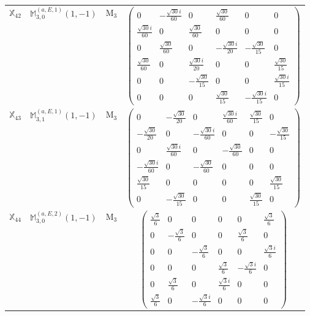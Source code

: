 \documentclass[fleqn,10pt,landscape]{article}
\begin{document}
\begin{itemize}
\begin{center}
\begin{longtable}{c|c|c|c}
$ \mathbb{X}_{42} $ & $\mathbb{M}_{3,0}^{(a,E,1)}(1,-1)$ & M$_{3}$ & $\begin{pmatrix} 0 & - \frac{\sqrt{30} i}{60} & 0 & \frac{\sqrt{30}}{60} & 0 & 0 \\ \frac{\sqrt{30} i}{60} & 0 & \frac{\sqrt{30}}{60} & 0 & 0 & 0 \\ 0 & \frac{\sqrt{30}}{60} & 0 & - \frac{\sqrt{30} i}{20} & - \frac{\sqrt{30}}{15} & 0 \\ \frac{\sqrt{30}}{60} & 0 & \frac{\sqrt{30} i}{20} & 0 & 0 & \frac{\sqrt{30}}{15} \\ 0 & 0 & - \frac{\sqrt{30}}{15} & 0 & 0 & \frac{\sqrt{30} i}{15} \\ 0 & 0 & 0 & \frac{\sqrt{30}}{15} & - \frac{\sqrt{30} i}{15} & 0 \end{pmatrix}$ \\
$ \mathbb{X}_{43} $ & $\mathbb{M}_{3,1}^{(a,E,1)}(1,-1)$ & M$_{3}$ & $\begin{pmatrix} 0 & - \frac{\sqrt{30}}{20} & 0 & \frac{\sqrt{30} i}{60} & \frac{\sqrt{30}}{15} & 0 \\ - \frac{\sqrt{30}}{20} & 0 & - \frac{\sqrt{30} i}{60} & 0 & 0 & - \frac{\sqrt{30}}{15} \\ 0 & \frac{\sqrt{30} i}{60} & 0 & - \frac{\sqrt{30}}{60} & 0 & 0 \\ - \frac{\sqrt{30} i}{60} & 0 & - \frac{\sqrt{30}}{60} & 0 & 0 & 0 \\ \frac{\sqrt{30}}{15} & 0 & 0 & 0 & 0 & \frac{\sqrt{30}}{15} \\ 0 & - \frac{\sqrt{30}}{15} & 0 & 0 & \frac{\sqrt{30}}{15} & 0 \end{pmatrix}$ \\
$ \mathbb{X}_{44} $ & $\mathbb{M}_{3,0}^{(a,E,2)}(1,-1)$ & M$_{3}$ & $\begin{pmatrix} \frac{\sqrt{3}}{6} & 0 & 0 & 0 & 0 & \frac{\sqrt{3}}{6} \\ 0 & - \frac{\sqrt{3}}{6} & 0 & 0 & \frac{\sqrt{3}}{6} & 0 \\ 0 & 0 & - \frac{\sqrt{3}}{6} & 0 & 0 & \frac{\sqrt{3} i}{6} \\ 0 & 0 & 0 & \frac{\sqrt{3}}{6} & - \frac{\sqrt{3} i}{6} & 0 \\ 0 & \frac{\sqrt{3}}{6} & 0 & \frac{\sqrt{3} i}{6} & 0 & 0 \\ \frac{\sqrt{3}}{6} & 0 & - \frac{\sqrt{3} i}{6} & 0 & 0 & 0 \end{pmatrix}$ \\

\end{longtable}
\end{center}
\end{itemize}
\end{document}
